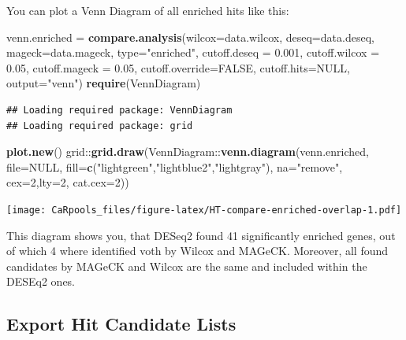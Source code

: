 \documentclass[]{article}
\newenvironment{Shaded}{\begin{snugshade}}{\end{snugshade}}
\newcommand{\KeywordTok}[1]{\textcolor[rgb]{0.13,0.29,0.53}{\textbf{{#1}}}}
\newcommand{\DataTypeTok}[1]{\textcolor[rgb]{0.13,0.29,0.53}{{#1}}}
\newcommand{\DecValTok}[1]{\textcolor[rgb]{0.00,0.00,0.81}{{#1}}}
\newcommand{\FloatTok}[1]{\textcolor[rgb]{0.00,0.00,0.81}{{#1}}}
\newcommand{\StringTok}[1]{\textcolor[rgb]{0.31,0.60,0.02}{{#1}}}
\newcommand{\OtherTok}[1]{\textcolor[rgb]{0.56,0.35,0.01}{{#1}}}
\newcommand{\NormalTok}[1]{{#1}}
\begin{document}
You can plot a Venn Diagram of all enriched hits like this:

\begin{Shaded}
\begin{Highlighting}[]
\NormalTok{venn.enriched =}\StringTok{ }\KeywordTok{compare.analysis}\NormalTok{(}\DataTypeTok{wilcox=}\NormalTok{data.wilcox, }\DataTypeTok{deseq=}\NormalTok{data.deseq, }\DataTypeTok{mageck=}\NormalTok{data.mageck, }\DataTypeTok{type=}\StringTok{"enriched"}\NormalTok{, }\DataTypeTok{cutoff.deseq =} \FloatTok{0.001}\NormalTok{, }\DataTypeTok{cutoff.wilcox =} \FloatTok{0.05}\NormalTok{, }\DataTypeTok{cutoff.mageck =} \FloatTok{0.05}\NormalTok{, }\DataTypeTok{cutoff.override=}\OtherTok{FALSE}\NormalTok{, }\DataTypeTok{cutoff.hits=}\OtherTok{NULL}\NormalTok{, }\DataTypeTok{output=}\StringTok{"venn"}\NormalTok{)}
\KeywordTok{require}\NormalTok{(VennDiagram)}
\end{Highlighting}
\end{Shaded}

\begin{verbatim}
## Loading required package: VennDiagram
## Loading required package: grid
\end{verbatim}

\begin{Shaded}
\begin{Highlighting}[]
\KeywordTok{plot.new}\NormalTok{()}
\NormalTok{grid::}\KeywordTok{grid.draw}\NormalTok{(VennDiagram::}\KeywordTok{venn.diagram}\NormalTok{(venn.enriched, }\DataTypeTok{file=}\OtherTok{NULL}\NormalTok{, }\DataTypeTok{fill=}\KeywordTok{c}\NormalTok{(}\StringTok{"lightgreen"}\NormalTok{,}\StringTok{"lightblue2"}\NormalTok{,}\StringTok{"lightgray"}\NormalTok{), }\DataTypeTok{na=}\StringTok{"remove"}\NormalTok{, }\DataTypeTok{cex=}\DecValTok{2}\NormalTok{,}\DataTypeTok{lty=}\DecValTok{2}\NormalTok{, }\DataTypeTok{cat.cex=}\DecValTok{2}\NormalTok{))}
\end{Highlighting}
\end{Shaded}

\texttt{[image: CaRpools\_files/figure-latex/HT-compare-enriched-overlap-1.pdf]}

This diagram shows you, that DESeq2 found 41 significantly enriched
genes, out of which 4 where identified voth by Wilcox and MAGeCK.
Moreover, all found candidates by MAGeCK and Wilcox are the same and
included within the DESEq2 ones.

\newpage

\subsection{Export Hit Candidate
Lists}\label{export-hit-candidate-lists}
\end{document}
